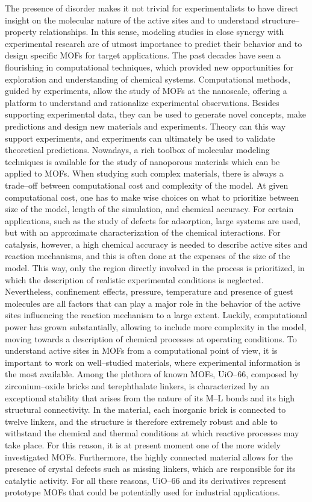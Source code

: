 The presence of disorder makes it not trivial for experimentalists to have direct insight on the molecular nature of the active sites and to understand structure--property relationships. In this sense, modeling studies in close synergy with experimental research are of utmost importance to predict their behavior and to design specific MOFs for target applications. The past decades have seen a flourishing in computational techniques, which provided new opportunities for exploration and understanding of chemical systems. Computational methods, guided by experiments, allow the study of MOFs at the nanoscale, offering a platform to understand and rationalize experimental observations. Besides supporting experimental data, they can be used to generate novel concepts, make predictions and design new materials and experiments. Theory can this way support experiments, and experiments can ultimately be used to validate theoretical predictions. 
\npar
Nowadays, a rich toolbox of molecular modeling techniques is available for the study of nanoporous materials which can be applied to MOFs. When studying such complex materials, there is always a trade--off between computational cost and complexity of the model. At given computational cost, one has to make wise choices on what to prioritize between size of the model, length of the simulation, and chemical accuracy. For certain applications, such as the study of defects for adsorption, large systems are used, but with an approximate characterization of the chemical interactions. For catalysis, however, a high chemical accuracy is needed to describe active sites and reaction mechanisms, and this is often done at the expenses of the size of the model. This way, only the region directly involved in the process is prioritized, in which the description of realistic experimental conditions is neglected. Nevertheless, confinement effects, pressure, temperature and presence of guest molecules are all factors that can play a major role in the behavior of the active sites influencing the reaction mechanism to a large extent. Luckily, computational power has grown substantially, allowing to include more complexity in the model, moving towards a description of chemical processes at operating conditions.
\npar
To understand active sites in MOFs from a computational point of view, it is important to work on well--studied materials, where experimental information is the most available. Among the plethora of known MOFs, UiO--66, composed by zirconium--oxide bricks and terephthalate linkers, is characterized by an exceptional stability that arises from the nature of its M--L bonds and its high structural connectivity. In the material, each inorganic brick is connected to twelve linkers, and the structure is therefore extremely robust and able to withstand the chemical and thermal conditions at which reactive processes may take place. For this reason, it is at present moment one of the more widely investigated MOFs. Furthermore, the highly connected material allows for the presence of crystal defects such as missing linkers, which are responsible for its catalytic activity. For all these reasons, UiO--66 and its derivatives represent prototype MOFs that could be potentially used for industrial applications. 
